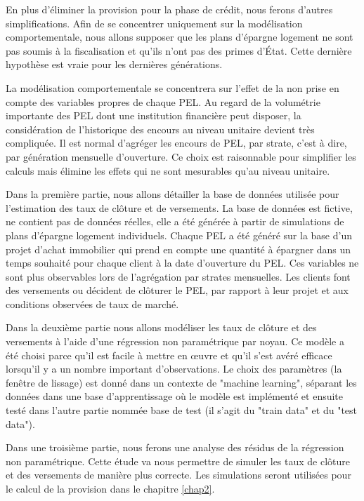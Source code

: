 \documentclass[12pt, a4paper]{book}
\begin{document}
En plus d'éliminer la provision pour la phase de crédit, nous ferons d'autres simplifications. Afin de se concentrer uniquement sur la modélisation comportementale, nous allons supposer que les plans d'épargne logement ne sont pas soumis à la fiscalisation et qu'ils n'ont pas des primes d'État. Cette dernière hypothèse est vraie pour les dernières générations. 

La modélisation comportementale se concentrera sur l'effet de la non prise en compte des variables propres de chaque PEL. Au regard de la volumétrie importante des PEL dont une institution financière peut disposer, la considération de l'historique des encours au niveau unitaire devient très compliquée. Il est normal d'agréger les encours de PEL, par strate, c'est à dire, par génération mensuelle d'ouverture. Ce choix est raisonnable pour simplifier les calculs mais élimine les effets qui ne sont mesurables qu'au niveau unitaire. 

Dans la première partie, nous allons détailler la base de données utilisée pour l'estimation des taux de clôture et de versements. La base de données est fictive, ne contient pas de données réelles, elle a été générée à partir de simulations de plans d'épargne logement individuels. Chaque PEL a été généré sur la base d'un projet d'achat immobilier qui prend en compte une quantité à épargner dans un temps souhaité pour chaque client à la date d'ouverture du PEL. Ces variables ne sont plus observables lors de l'agrégation par strates mensuelles. Les clients font des versements ou décident de clôturer le PEL, par rapport à leur projet et aux conditions observées de taux de marché.

Dans la deuxième partie nous allons modéliser les taux de clôture et des versements à l'aide d'une régression non paramétrique par noyau. Ce modèle a été choisi parce qu'il est facile à mettre en œuvre et qu'il s'est avéré efficace lorsqu'il y a un nombre important d'observations. Le choix des paramètres (la fenêtre de lissage) est donné dans un contexte de "machine learning", séparant les données dans une base d'apprentissage où le modèle est implémenté et ensuite testé dans l'autre partie nommée base de test (il s'agit du "train data" et du "test data"). 

Dans une troisième partie, nous ferons une analyse des résidus de la régression non paramétrique. Cette étude va nous permettre de simuler les taux de clôture et des versements de manière plus correcte. Les simulations seront utilisées pour le calcul de la provision dans le chapitre \ref{chap2}.
\end{document}

